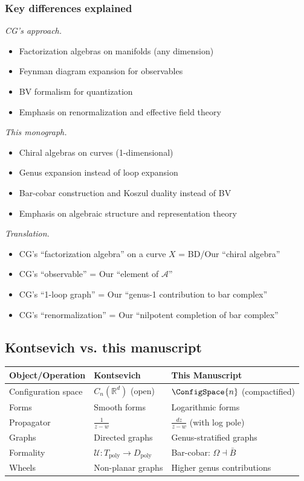 \subsubsection{Key differences explained}

\emph{CG's approach.}
\begin{itemize}
\item Factorization algebras on manifolds (any dimension)
\item Feynman diagram expansion for observables
\item BV formalism for quantization
\item Emphasis on renormalization and effective field theory
\end{itemize}

\emph{This monograph.}
\begin{itemize}
\item Chiral algebras on curves (1-dimensional)
\item Genus expansion instead of loop expansion
\item Bar-cobar construction and Koszul duality instead of BV
\item Emphasis on algebraic structure and representation theory
\end{itemize}

\emph{Translation.}
\begin{itemize}
\item CG's ``factorization algebra'' on a curve $X$ = BD/Our ``chiral algebra''
\item CG's ``observable'' = Our ``element of $\mathcal{A}$''
\item CG's ``1-loop graph'' = Our ``genus-1 contribution to bar complex''
\item CG's ``renormalization'' = Our ``nilpotent completion of bar complex''
\end{itemize}

\subsection{Kontsevich vs. this manuscript}

\begin{center}
\begin{tabular}{|>{\raggedright\arraybackslash}p{5.8cm}|>{\raggedright\arraybackslash}p{3.9cm}|>{\raggedright\arraybackslash}p{3.9cm}|}
\hline
\textbf{Object/Operation} & \textbf{Kontsevich \cite{Kon99}} & \textbf{This Manuscript} \\
\hline
Configuration space & $C_n(\mathbb{R}^d)$ (open) & $\ConfigSpace{n}$ (compactified) \\
Forms & Smooth forms & Logarithmic forms \\
Propagator & $\frac{1}{z-w}$ & $\frac{dz}{z-w}$ (with log pole) \\
Graphs & Directed graphs & Genus-stratified graphs \\
Formality & $\mathcal{U}: T_{\text{poly}} \to D_{\text{poly}}$ & Bar-cobar: $\Omega \dashv \bar{B}$ \\
Wheels & Non-planar graphs & Higher genus contributions \\
\hline
\end{tabular}
\end{center}

